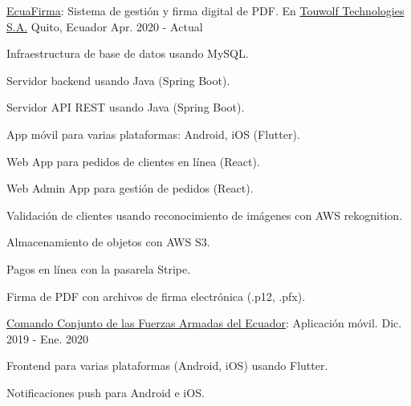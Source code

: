 
\begin{cventries}

  \cventry
    {\href{https://ecuafirma.com}{EcuaFirma}: Sistema de gestión y firma digital de PDF.} %
    {En \href{https://touwolf.com/}{Touwolf Technologies S.A.}} %
    {Quito, Ecuador} %
    {Apr. 2020 - Actual} %
    {
      \begin{cvitems} %
        \item {Infraestructura de base de datos usando MySQL.}
        \item {Servidor backend usando Java (Spring Boot).}
        \item {Servidor API REST usando Java (Spring Boot).}
        \item {App móvil para varias plataformas: Android, iOS (Flutter).}
        \item {Web App para pedidos de clientes en línea (React).}
        \item {Web Admin App para gestión de pedidos (React).}
        \item {Validación de clientes usando reconocimiento de imágenes con AWS rekognition.}
        \item {Almacenamiento de objetos con AWS S3.}
        \item {Pagos en línea con la pasarela Stripe.}
        \item {Firma de PDF con archivos de firma electrónica (.p12, .pfx).}
      \end{cvitems}
    }

  \cventry
    {\href{https://www.ccffaa.mil.ec/}{Comando Conjunto de las Fuerzas Armadas del Ecuador}: Aplicación móvil.} %
    {} %
    {} %
    {Dic. 2019 - Ene. 2020} %
    {
      \begin{cvitems} %
        \item {Frontend para varias plataformas (Android, iOS) usando Flutter.}
        \item {Notificaciones push para Android e iOS.}
      \end{cvitems}
    }


\end{cventries}
